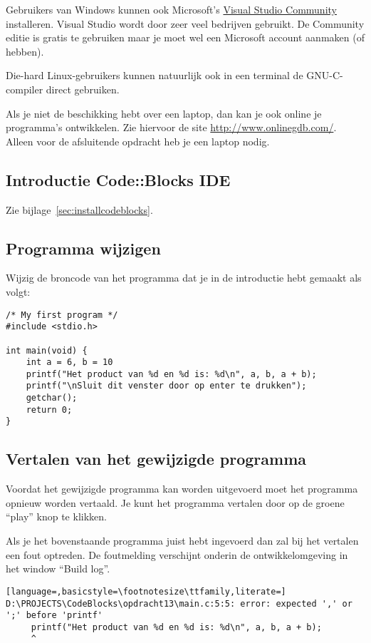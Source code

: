 \documentclass[a4paper,10pt,fleqn,twoside]{article}
\begin{document}
Gebruikers van Windows kunnen ook Microsoft’s \href{https://visualstudio.microsoft.com/vs/community/}{Visual Studio Community} installeren. Visual Studio wordt door zeer veel bedrijven gebruikt. De Community editie is gratis te gebruiken maar je moet wel een Microsoft account aanmaken (of hebben).

Die-hard Linux-gebruikers kunnen natuurlijk ook in een terminal de GNU-C-compiler direct gebruiken.

Als je niet de beschikking hebt over een laptop, dan kan je ook online je programma's ontwikkelen. Zie hiervoor de site \url{http://www.onlinegdb.com/}. Alleen voor de afsluitende opdracht heb je een laptop nodig.

\subsection{Introductie Code::Blocks IDE}

Zie bijlage~\ref{sec:installcodeblocks}.

\subsection{Programma wijzigen}
Wijzig de broncode van het programma dat je in de introductie hebt gemaakt als volgt:

\begin{lstlisting}
/* My first program */
#include <stdio.h>

int main(void) {
    int a = 6, b = 10
    printf("Het product van %d en %d is: %d\n", a, b, a + b);
    printf("\nSluit dit venster door op enter te drukken");
    getchar();
    return 0;
}
\end{lstlisting}

\subsection{Vertalen van het gewijzigde programma
}Voordat het gewijzigde programma kan worden uitgevoerd moet het programma opnieuw worden vertaald. Je kunt het programma vertalen door op de groene ``play'' knop te klikken.

Als je het bovenstaande programma juist hebt ingevoerd dan zal bij het vertalen een fout optreden. De foutmelding verschijnt onderin de ontwikkelomgeving in het window ``Build log''. 

\begin{lstlisting}[language=,basicstyle=\footnotesize\ttfamily,literate=]
D:\PROJECTS\CodeBlocks\opdracht13\main.c:5:5: error: expected ',' or ';' before 'printf'
     printf("Het product van %d en %d is: %d\n", a, b, a + b);
     ^
\end{lstlisting}
\end{document}
